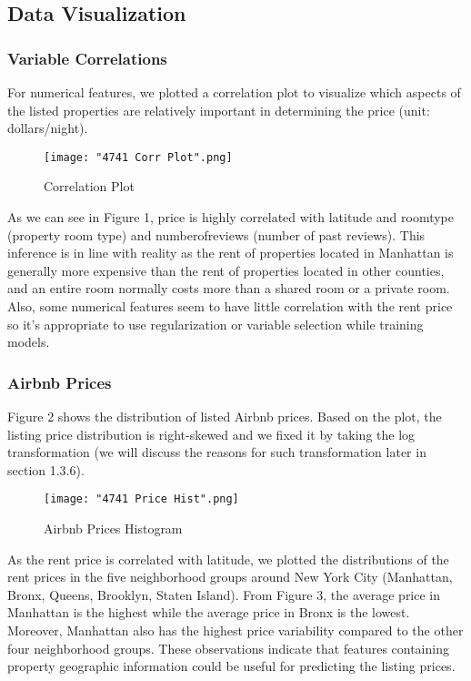 \documentclass[twocolumn]{article}
\begin{document}
\subsection{Data Visualization}
\subsubsection{Variable Correlations}
For numerical features, we plotted a correlation plot to visualize which aspects of the listed properties are relatively important in determining the price (unit: dollars/night).  

\begin{figure}[h]
    \centering
    \texttt{[image: "4741 Corr Plot".png]}
    \caption{Correlation Plot}
\end{figure}

As we can see in Figure 1, price is highly correlated with latitude and room\textunderscore type (property room type) and number\textunderscore of\textunderscore reviews (number of past reviews). This inference is in line with reality as the rent of properties located in Manhattan is generally more expensive than the rent of properties located in other counties, and an entire room normally costs more than a shared room or a private room. Also, some numerical features seem to have little correlation with the rent price so it’s appropriate to use regularization or variable selection while training models. 


\subsubsection{Airbnb Prices}
Figure 2 shows the distribution of listed Airbnb prices. Based on the plot, the listing price distribution is right-skewed and we fixed it by taking the log transformation (we will discuss the reasons for such transformation later in section 1.3.6). 

\begin{figure}[h]
    \centering
    \texttt{[image: "4741 Price Hist".png]}
    \caption{Airbnb Prices Histogram}
\end{figure}

As the rent price is correlated with latitude, we plotted the distributions of the rent prices in the five neighborhood groups around New York City (Manhattan, Bronx, Queens, Brooklyn, Staten Island). From Figure 3, the average price in Manhattan is the highest while the average price in Bronx is the lowest. Moreover, Manhattan also has the highest price variability compared to the other four neighborhood groups. These observations indicate that features containing property geographic information could be useful for predicting the listing prices. 
\end{document}
